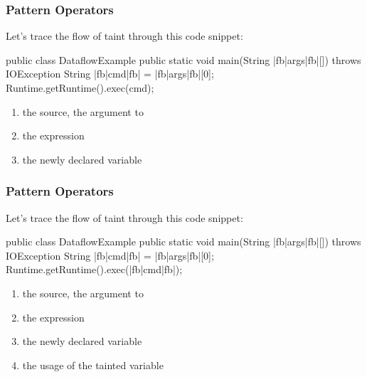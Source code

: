 \documentclass[aspectratio=169, handout]{beamer}
\begin{document}
\begin{frame}[fragile]
  \frametitle{Pattern Operators}

  \begin{minipage}[t][1.6in][t]{\textwidth}
    Let's trace the flow of taint through this code snippet:

    \begin{pythoncodeblock}[language=java]
      public class DataflowExample {
        public static void main(String |fb|args|fb|[]) throws IOException {
          String |fb|cmd|fb| = |fb|args|fb|[0];
          Runtime.getRuntime().exec(cmd);
        }
      }
    \end{pythoncodeblock}
  \end{minipage}
  \begin{minipage}[t][1in][t]{\textwidth}
    \begin{enumerate}
      \item the source, the  argument to 
      \item the expression 
      \item the newly declared variable 
    \end{enumerate}
  \end{minipage}
\end{frame}

\begin{frame}[fragile]
  \frametitle{Pattern Operators}

  \begin{minipage}[t][1.6in][t]{\textwidth}
    Let's trace the flow of taint through this code snippet:

    \begin{pythoncodeblock}[language=java]
      public class DataflowExample {
        public static void main(String |fb|args|fb|[]) throws IOException {
          String |fb|cmd|fb| = |fb|args|fb|[0];
          Runtime.getRuntime().exec(|fb|cmd|fb|);
        }
      }
    \end{pythoncodeblock}
  \end{minipage}
  \begin{minipage}[t][1in][t]{\textwidth}
    \begin{enumerate}
      \item the source, the  argument to 
      \item the expression 
      \item the newly declared variable 
      \item the usage of the tainted variable 
    \end{enumerate}
  \end{minipage}
\end{frame}
\end{document}
